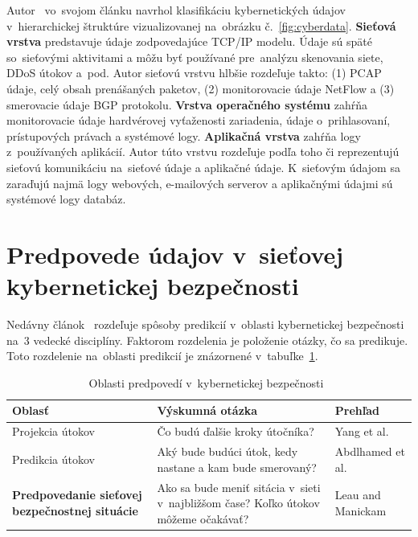 \documentclass[thesismargins, thesislinespacing, openright, upjsfrontpage]{rnthesis}
\begin{document}
Autor~\cite{wang2013cyber} vo~svojom článku navrhol klasifikáciu kybernetických údajov v~hierarchickej štruktúre vizualizovanej na~obrázku č.~\ref{fig:cyberdata}. \textbf{Sieťová vrstva} predstavuje údaje zodpovedajúce TCP/IP modelu. Údaje sú späté so~sieťovými aktivitami a môžu byť používané pre~analýzu skenovania siete, DDoS útokov a~pod. Autor sieťovú vrstvu hlbšie rozdeľuje takto: (1) PCAP údaje, celý obsah prenášaných paketov, (2) monitorovacie údaje NetFlow a (3) smerovacie údaje BGP protokolu. \textbf{Vrstva operačného systému} zahŕňa monitorovacie údaje hardvérovej vyťaženosti zariadenia, údaje o~prihlasovaní, prístupových právach a systémové logy. \textbf{Aplikačná vrstva} zahŕňa logy z~používaných aplikácií. Autor túto vrstvu rozdeľuje podľa toho či reprezentujú sieťovú komunikáciu na~sieťové údaje a aplikačné údaje. K~sieťovým údajom sa zaraďujú najmä logy webových, e-mailových serverov a aplikačnými údajmi sú systémové logy databáz.


\section{Predpovede údajov v~sieťovej kybernetickej bezpečnosti} \label{discipliny}

Nedávny článok~\cite{Husak2018survey} rozdeľuje spôsoby predikcií v~oblasti kybernetickej bezpečnosti na~3 vedecké disciplíny. Faktorom rozdelenia je položenie otázky, čo sa predikuje. Toto rozdelenie na~oblasti predikcií je znázornené v~tabuľke~\ref{Tab:husak}.

\begin{table}
\begin{center}
\begin{tabular}{ | p{4cm} | p{6cm} | p{3cm} | }
\hline
\textbf{Oblasť} & \textbf{Výskumná otázka} & \textbf{Prehľad} \\
\hline
\hline Projekcia útokov & Čo budú ďalšie kroky útočníka? & Yang et al.~\cite{Yang2014} \\
\hline Predikcia útokov & Aký bude budúci útok, kedy nastane a kam bude smerovaný? & Abdlhamed et al.~\cite{Abdlhamed2017} \\
\hline \textbf{Predpovedanie sieťovej bezpečnostnej situácie} & Ako sa bude meniť sitácia v~sieti v~najbližšom čase? Koľko útokov môžeme očakávať? & Leau and  Manickam~\cite{Leau2015} \\
\hline
\end{tabular}
\end{center}
\label{Tab:husak}
\caption{Oblasti predpovedí v~kybernetickej bezpečnosti~\cite{Husak2018survey}}
\end{table}
\end{document}
